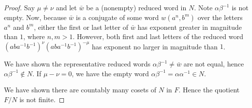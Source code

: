 \documentclass[onesided]{ccg-pset}
\begin{document}
\begin{enumerate}
\begin{proof}
            Say $\mu \neq \nu$ and let $\bar{w}$ be a (nonempty) reduced word in $N$. Note $\alpha\beta^{-1}$ is not empty. Now, because $\bar{w}$ is a conjugate of some word $w(a^n, b^m)$ over the letters $a^n$ and $b^m$, either the first or last letter of $\bar{w}$ has exponent greater in magnitude than $1$, where $n, m >1$. However, both first and last letters of the reduced word $(aba^{-1}b^{-1})^{\nu}(aba^{-1}b^{-1})^{-\mu}$ has exponent no larger in magnitude than $1$. 

            We have shown the representative reduced words $\alpha\beta^{-1} \neq \bar{w}$ are not equal, hence $\alpha\beta^{-1}\not\in N$. If $\mu - \nu = 0$, we have the empty word $\alpha\beta^{-1} = \alpha\alpha^{-1} \in N$. 

            We have shown there are countably many cosets of $N$ in $F$. Hence the quotient $F/N$ is not finite.
        \end{proof}
\end{enumerate}
\end{document}
